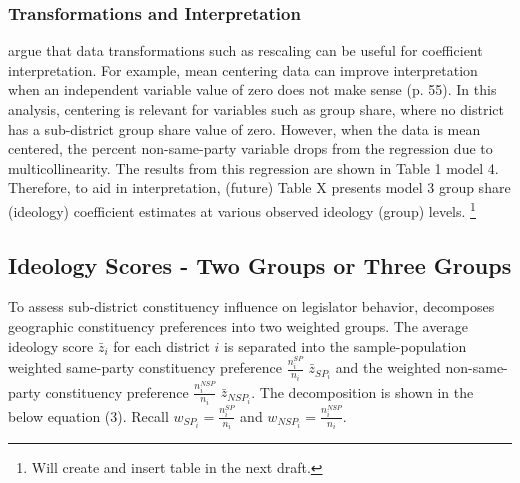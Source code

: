 \documentclass[10pt,letterpaper]{article}
\begin{document}






 

\subsubsection{Transformations and Interpretation}


\cite{Gelman2007} argue that data transformations such as rescaling can be useful for coefficient interpretation. For example, mean centering data can improve interpretation when an independent variable value of zero does not make sense (p. 55). In this analysis, centering is relevant for variables such as group share, where no district has a sub-district group share value of zero. However, when the data is mean centered, the percent non-same-party variable drops from the regression due to multicollinearity. The results from this regression are shown in Table 1 model 4.  Therefore, to aid in interpretation, (future) Table X presents model 3 group share (ideology) coefficient estimates at various observed ideology (group) levels. \footnote{Will create and insert table in the next draft.}

\subsection{Ideology Scores - Two Groups or Three Groups}
To assess sub-district constituency influence on legislator behavior, \cite{Clinton2006} decomposes geographic constituency preferences into two weighted groups. The average ideology score $\bar{z}_i$ for each district $i$ is separated into the sample-population weighted same-party constituency preference $\frac{n_i^{SP}}{n_i}$ $\bar{z}_{SP_i}$ and the weighted non-same-party constituency preference $\frac{n_i^{NSP}}{n_i}$ $\bar{z}_{NSP_i}$. The decomposition is shown in the below equation (3). Recall $w_{SP_i} =\frac{n_i^{SP}}{n_i}$ and $w_{NSP_i} =\frac{n_i^{NSP}}{n_i}$.
\end{document}
